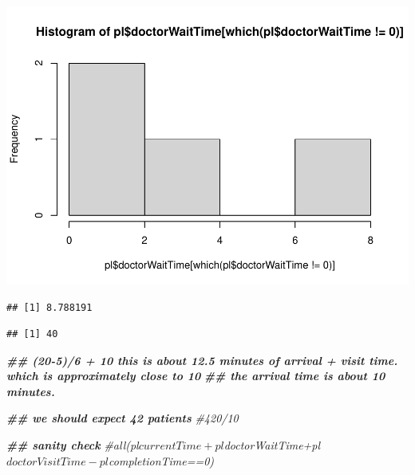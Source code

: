\documentclass[
]{book}
\newenvironment{Shaded}{\begin{snugshade}}{\end{snugshade}}
\newcommand{\CommentTok}[1]{\textcolor[rgb]{0.56,0.35,0.01}{\textit{#1}}}
\newcommand{\DecValTok}[1]{\textcolor[rgb]{0.00,0.00,0.81}{#1}}
\newcommand{\DocumentationTok}[1]{\textcolor[rgb]{0.56,0.35,0.01}{\textbf{\textit{#1}}}}
\newcommand{\FunctionTok}[1]{\textcolor[rgb]{0.00,0.00,0.00}{#1}}
\newcommand{\NormalTok}[1]{#1}
\newcommand{\SpecialCharTok}[1]{\textcolor[rgb]{0.00,0.00,0.00}{#1}}
\theoremstyle{definition}
\theoremstyle{definition}
\theoremstyle{definition}
\theoremstyle{definition}
\theoremstyle{remark}
\begin{document}
\includegraphics{_main_files/figure-latex/unnamed-chunk-9-3.pdf}

\begin{Shaded}
\end{Shaded}

\begin{verbatim}
## [1] 8.788191
\end{verbatim}

\begin{Shaded}
\end{Shaded}

\begin{verbatim}
## [1] 40
\end{verbatim}

\begin{Shaded}
\begin{Highlighting}[]
\DocumentationTok{\#\# (20{-}5)/6 + 10 this is about 12.5 minutes of arrival + visit time. which is approximately close to 10 }
\DocumentationTok{\#\# the arrival time is about 10 minutes.  }

\DocumentationTok{\#\# we should expect 42 patients}
 \CommentTok{\#420/10}
  
  \DocumentationTok{\#\# sanity check}
  \CommentTok{\#all(pl$currentTime+pl$doctorWaitTime+pl$doctorVisitTime{-}pl$completionTime==0)}
\end{Highlighting}
\end{Shaded}
\end{document}
